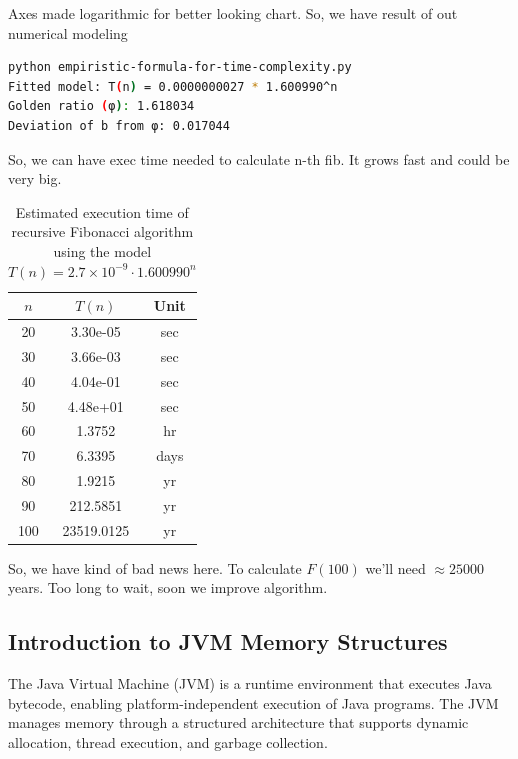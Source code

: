 \documentclass{article}
\begin{document}
Axes made logarithmic for better looking chart.
So, we have result of out numerical modeling 
\begin{lstlisting}[language=bash]
python empiristic-formula-for-time-complexity.py
Fitted model: T(n) = 0.0000000027 * 1.600990^n
Golden ratio (φ): 1.618034
Deviation of b from φ: 0.017044
\end{lstlisting}

So, we can have exec time needed to calculate n-th fib. It grows fast and could be very big.

\begin{table}[h]
	\centering
	\caption{Estimated execution time of recursive Fibonacci algorithm using the model $T(n) = 2.7 \times 10^{-9} \cdot 1.600990^n$}
	\begin{tabular}{|c|c|c|}
		\hline
		$n$ & $T(n)$ & Unit \\
		\hline
		20 & 3.30e-05 & sec \\ 
		\hline
		30 & 3.66e-03 & sec \\ 
		\hline
		40 & 4.04e-01 & sec \\ 
		\hline
		50 & 4.48e+01 & sec \\ 
		\hline
		60 & 1.3752 & hr \\ 
		\hline
		70 & 6.3395 & days \\ 
		\hline
		80 & 1.9215 & yr \\ 
		\hline
		90 & 212.5851 & yr \\ 
		\hline
		100 & 23519.0125 & yr \\ 
		\hline
		
	\end{tabular}
\end{table}

So, we have kind of bad news here. To calculate $F(100)$ we'll need $\approx 25 000$ years. Too long to wait, soon we improve algorithm.

\subsection{Introduction to JVM Memory Structures}

The Java Virtual Machine (JVM) is a runtime environment that executes Java bytecode, enabling platform-independent execution of Java programs. The JVM manages memory through a structured architecture that supports dynamic allocation, thread execution, and garbage collection.
\end{document}
